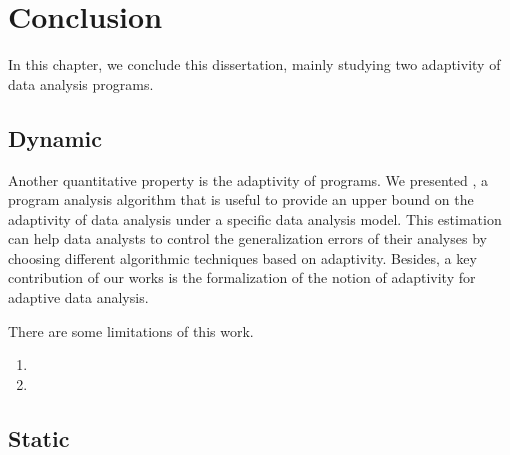 \chapter{Conclusion}
\label{ch:conclusion}

In this chapter, we conclude this dissertation, mainly studying two adaptivity of data analysis programs.


 
 \section{Dynamic}
 
 Another quantitative property is the adaptivity of programs. We presented {\ADAPTSYSTEM}, 
 a program analysis algorithm that is useful to provide an upper bound on the adaptivity of data analysis under a specific data analysis model. 
 This estimation can help data analysts to control the generalization errors of their analyses by choosing different algorithmic techniques based on adaptivity. 
 Besides, a key contribution of our works is the formalization of the notion of adaptivity for adaptive data analysis. 

 There are some limitations of this work. 
 \begin{enumerate}
     \item 
     
     \item 
 \end{enumerate}
 
 \section{Static}
